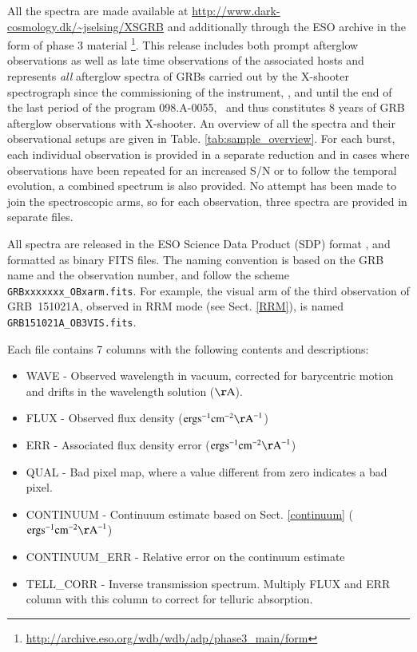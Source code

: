 \documentclass{aa}    %
\begin{document}
All the spectra are made available at
\url{http://www.dark-cosmology.dk/~jselsing/XSGRB} and additionally through the
ESO archive in the form of phase 3 material
\footnote{\url{http://archive.eso.org/wdb/wdb/adp/phase3_main/form}}. This
release includes both prompt afterglow observations as well as late time
observations of the associated hosts and represents \textit{all} afterglow
spectra of GRBs carried out by the X-shooter spectrograph since the
commissioning of the instrument, \startdate, and until the end of the last
period of the program 098.A-0055, \termdate~and thus constitutes 8 years of GRB
afterglow observations with X-shooter. An overview of all the spectra and their
observational setups are given in Table. \ref{tab:sample_overview}. For each
burst, each individual observation is provided in a separate reduction and in
cases where observations have been repeated for an increased S/N or to follow
the temporal evolution, a combined spectrum is also provided. No attempt has
been made to join the spectroscopic arms, so for each observation, three spectra
are provided in separate files.

All spectra are released in the ESO Science Data Product (SDP) format
\citep{Micol2016}, and formatted as binary FITS files. The naming convention is
based on the GRB name and the observation number, and follow the scheme
\texttt{GRBxxxxxxx\_OBxarm.fits}. For example, the visual arm of the third
observation of GRB~151021A, observed in RRM mode (see Sect. \ref{RRM}), is named
\texttt{GRB151021A\_OB3VIS.fits}.

Each file contains 7 columns with the following contents and descriptions:
\begin{itemize}
	\item WAVE - Observed wavelength in vacuum, corrected for barycentric motion and drifts in the wavelength solution ($\mathrm{\AA}$).
	\item FLUX - Observed flux density ($\mathrm{erg} \mathrm{s}^{-1} \mathrm{cm}^{-2} \mathrm{\AA}^{-1}$)
	\item ERR - Associated flux density error ($\mathrm{erg} \mathrm{s}^{-1} \mathrm{cm}^{-2} \mathrm{\AA}^{-1}$)
	\item QUAL - Bad pixel map, where a value different from zero indicates a bad pixel.
	\item CONTINUUM - Continuum estimate based on Sect. \ref{continuum} ($\mathrm{erg} \mathrm{s}^{-1} \mathrm{cm}^{-2} \mathrm{\AA}^{-1}$)
	\item CONTINUUM\_ERR - Relative error on the continuum estimate 
	\item TELL\_CORR - Inverse transmission spectrum. Multiply FLUX and ERR column with this column to correct for telluric absorption. 
\end{itemize}
\end{document}
